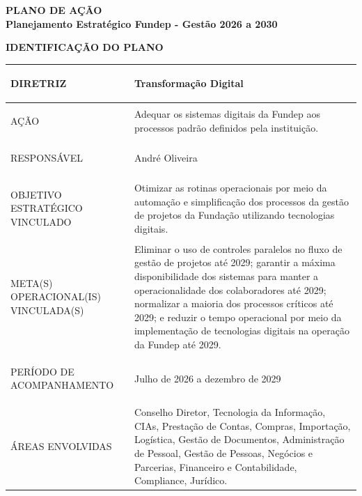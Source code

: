 \documentclass[12pt,a4paper]{article}
\newcommand{\PlanoVersao}{0.1}
\newcommand{\secao}[1]{%
  \par\vspace{\dimexpr16pt-\parskip\relax}%
  {\noindent\bfseries\color{azulTitulo}\fontsize{13}{16}\selectfont #1}%
  \par\vspace{\dimexpr8pt-\parskip\relax}%
}
\newlength{\utilTab}
\newlength{\colIdRot}\newlength{\colIdVal}
\begin{document}
\thispagestyle{empty}


\begin{center}
  \singlespacing
  {\bfseries\color{azulTitulo}\fontsize{17}{20}\selectfont PLANO DE AÇÃO}\\[6pt]
  {\bfseries\color{azulTitulo}\fontsize{13}{16}\selectfont Planejamento Estratégico Fundep - Gestão 2026 a 2030}
\end{center}

\secao{IDENTIFICAÇÃO DO PLANO}

\begingroup
\footnotesize\singlespacing
{}
\setlength{\arrayrulewidth}{1pt}
\setlength{\tabcolsep}{5.4pt}
\renewcommand{\arraystretch}{1.45}
\setlength{\utilTab}{\dimexpr\textwidth-4\tabcolsep-3\arrayrulewidth\relax}
\setlength{\colIdRot}{0.2819\utilTab}
\setlength{\colIdVal}{\dimexpr\utilTab-\colIdRot\relax}
\begin{tabular}{|>{\cellcolor{azulClaro}\bfseries\raggedright\arraybackslash}p{\colIdRot}|>{\raggedright\arraybackslash}p{\colIdVal}|}
\hline
DIRETRIZ & Transformação Digital \\
\hline
AÇÃO & Adequar os sistemas digitais da Fundep aos processos padrão definidos pela instituição. \\
\hline
RESPONSÁVEL & André Oliveira \\
\hline
OBJETIVO ESTRATÉGICO VINCULADO & Otimizar as rotinas operacionais por meio da automação e simplificação dos processos da gestão de projetos da Fundação utilizando tecnologias digitais. \\
\hline
META(S) OPERACIONAL(IS) VINCULADA(S) & Eliminar o uso de controles paralelos no fluxo de gestão de projetos até 2029; garantir a máxima disponibilidade dos sistemas para manter a operacionalidade dos colaboradores até 2029; normalizar a maioria dos processos críticos até 2029; e reduzir o tempo operacional por meio da implementação de tecnologias digitais na operação da Fundep até 2029. \\
\hline
PERÍODO DE ACOMPANHAMENTO & Julho de 2026 a dezembro de 2029 \\
\hline
ÁREAS ENVOLVIDAS & Conselho Diretor, Tecnologia da Informação, CIAs, Prestação de Contas, Compras, Importação, Logística, Gestão de Documentos, Administração de Pessoal, Gestão de Pessoas, Negócios e Parcerias, Financeiro e Contabilidade, Compliance, Jurídico. \\
\hline
\end{tabular}
\endgroup
\end{document}
